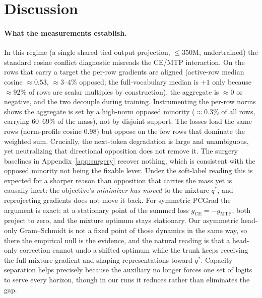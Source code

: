 \section{Discussion}
\label{sec:discussion}

\paragraph{What the measurements establish.} In this regime (a single shared tied output projection, ${\leq}350$M, undertrained) the standard cosine
conflict diagnostic misreads the CE/MTP interaction. On the rows that carry a
target the per-row gradients are aligned (active-row median cosine ${\approx}0.53$,
${\approx}3$--$4\%$ opposed; the full-vocabulary median is $+1$ only because
${\approx}92\%$ of rows are scalar multiples by construction), the aggregate
is $\approx 0$ or negative, and the two decouple during training. Instrumenting the per-row norms shows the aggregate is set by a high-norm opposed minority ($\approx0.3\%$ of all rows, carrying $60$--$69\%$ of the mass), not by disjoint support. The losses load the same rows (norm-profile cosine $0.98$) but oppose on the few rows that dominate the weighted sum. Crucially, the next-token degradation is large and
unambiguous, yet neutralizing that directional opposition does not remove it. The surgery
baselines in Appendix~\ref{app:surgery} recover nothing, which is consistent
with the opposed minority not being the fixable lever. Under the soft-label reading
this is expected for a sharper reason than opposition that carries the mass yet is
causally inert: the objective's \emph{minimizer has moved} to the mixture $q^{*}$,
and reprojecting gradients does not move it back. For symmetric PCGrad the argument
is exact: at a stationary point of the summed loss $g_{\text{CE}} = -g_{\text{MTP}}$,
both project to zero, and the mixture optimum stays stationary. Our asymmetric
head-only Gram--Schmidt is not a fixed point of those dynamics in the same way, so
there the empirical null is the evidence, and the natural reading is that a head-only
correction cannot undo a shifted optimum while the trunk keeps receiving the full
mixture gradient and shaping representations toward $q^{*}$. Capacity separation helps precisely because the auxiliary no longer forces one set of logits to serve every horizon,
though in our runs it reduces rather than eliminates the gap.

